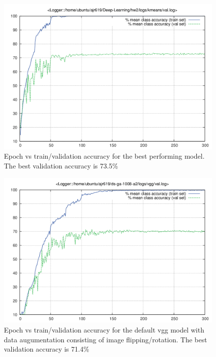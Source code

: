 \documentclass{article}
\begin{document}
\begin{figure}[ht!]
  \centering
  \includegraphics[width=\textwidth]{images/kmeans/val}
  \caption{Epoch vs train/validation accuracy for the best performing model. The best validation accuracy is 73.5\%}
\end{figure}

\begin{figure}[ht!]
  \centering
  \includegraphics[width=\textwidth]{images/kmeans.1/val}
  \caption{Epoch vs train/validation accuracy for the default vgg model with data augumentation consisting of image flipping/rotation. The best validation accuracy is 71.4\%}
\end{figure}
\end{document}

